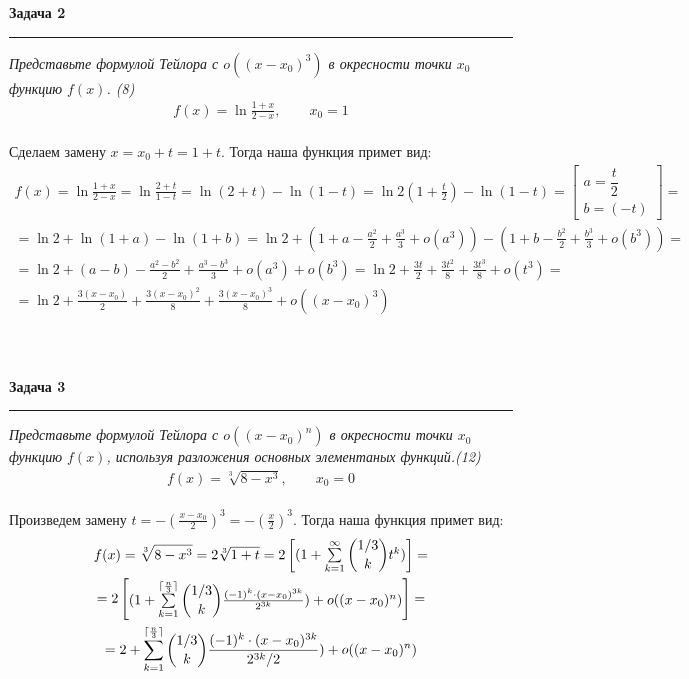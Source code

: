 \documentclass[a4paper,11pt]{article}
\begin{document}
\textbf{\large Задача 2}
\medskip\hrule\medskip
\textsl{Представьте формулой Тейлора с $ o((x - x_0)^3) $  в окресности точки $ x_0 $ функцию $ f(x) $. (8)}
\begin{align*}
	f(x) = \ln \frac{1 + x}{2 - x}, \qquad x_0 = 1
\end{align*} \\
 
Сделаем замену $ x = x_0 + t = 1 + t $. Тогда наша функция примет вид:
\begin{gather*}
	f(x) = \ln \frac{1 + x}{2 - x} = 
	\ln \frac{2 + t}{1 - t} = 
	\ln (2 + t) - \ln (1 - t) = 
	\ln 2(1 + \frac{t}{2}) - \ln (1 - t) = 
	\begin{bmatrix}
	 a = \dfrac{t}{2} \\[5pt]
	 b = (-t) 
	\end{bmatrix} = \\
	= \ln 2 + \ln (1 + a) - \ln (1 + b) = 
	\ln 2 + (1 + a - \frac{a^2}{2} + \frac{a^3}{3} + o(a^3)) - (1 + b - \frac{b^2}{2} + \frac{b^3}{3} + o(b^3)) = \\
	= \ln 2 + (a - b) - \frac{a^2 - b^2}{2} + \frac{a^3 - b^3}{3} + o(a^3) + o(b^3) = 
	\ln 2 + \frac{3t}{2} + \frac{3t^2}{8} + \frac{3t^3}{8} + o(t^3)  = \\
	= \ln 2 + \frac{3(x - x_0)}{2} + \frac{3(x - x_0)^2}{8} + \frac{3(x - x_0)^3}{8} + o((x - x_0)^3)	
\end{gather*} 
\\ \\ \\









\textbf{\large Задача 3}
\medskip\hrule\medskip
\textsl{Представьте формулой Тейлора с $ o((x - x_0)^n) $ в окресности точки $ x_0 $ функцию $ f(x) $, используя разложения основных элементаных функций.(12)}
\begin{align*}
	f(x) = \sqrt[3]{8 - x^3}, \qquad x_0 = 0
\end{align*} \\

Произведем замену $ t = -(\frac{x - x_0}{2})^3 = -(\frac{x}{2})^3$. Тогда наша функция примет вид:
\begin{gather*}	
	f(x) = \sqrt[3]{8 - x^3} = 
	2 \sqrt[3]{1 + t} = 
	2\begin{bmatrix}(1 + \sum\limits_{k = 1}^{\infty} \dbinom{1/3}{k}t^k)\end{bmatrix} = \\
	= 2\begin{bmatrix}(1 + \sum\limits_{k = 1}^{\lceil \frac{n}{3}\rceil} \dbinom{1/3}{k} \frac{(-1)^k \cdot (x - x_0)^{3k} }{2^{3k}}) + o((x - x_0)^n) \end{bmatrix} = \\
	= 2 + \sum\limits_{k = 1}^{\lceil \frac{n}{3}\rceil} \dbinom{1/3}{k} \frac{(-1)^k \cdot (x - x_0)^{3k} }{2^{3k} /2}) + o((x - x_0)^n)  
\end{gather*}
\newpage
\end{document}
